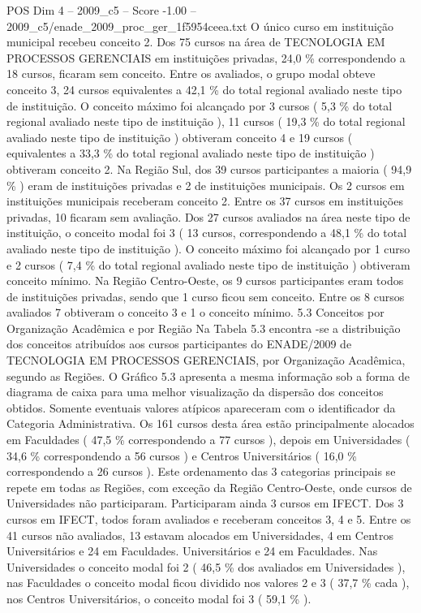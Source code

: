 \begin{textsample}{POS Dim 4 – 2009\_c5 – Score -1.00 – 2009\_c5/enade\_2009\_proc\_ger\_1f5954ceea.txt}
O único curso em instituição municipal recebeu conceito 2.
Dos 75 cursos na área de TECNOLOGIA EM PROCESSOS GERENCIAIS em instituições privadas, 24,0 \% correspondendo a 18 cursos, ficaram sem conceito.
Entre os avaliados, o grupo modal obteve conceito 3, 24 cursos equivalentes a 42,1 \% do total regional avaliado neste tipo de instituição.
O conceito máximo foi alcançado por 3 cursos ( 5,3 \% do total regional avaliado neste tipo de instituição ), 11 cursos ( 19,3 \% do total regional avaliado neste tipo de instituição ) obtiveram conceito 4 e 19 cursos ( equivalentes a 33,3 \% do total regional avaliado neste tipo de instituição ) obtiveram conceito 2.
Na Região Sul, dos 39 cursos participantes a maioria ( 94,9 \% ) eram de instituições privadas e 2 de instituições municipais.
Os 2 cursos em instituições municipais receberam conceito 2.
Entre os 37 cursos em instituições privadas, 10 ficaram sem avaliação.
Dos 27 cursos avaliados na área neste tipo de instituição, o conceito modal foi 3 ( 13 cursos, correspondendo a 48,1 \% do total avaliado neste tipo de instituição ).
O conceito máximo foi alcançado por 1 curso e 2 cursos ( 7,4 \% do total regional avaliado neste tipo de instituição ) obtiveram conceito mínimo.
Na Região Centro-Oeste, os 9 cursos participantes eram todos de instituições privadas, sendo que 1 curso ficou sem conceito.
Entre os 8 cursos avaliados 7 obtiveram o conceito 3 e 1 o conceito mínimo. 5.3 Conceitos por Organização Acadêmica e por Região Na Tabela 5.3 encontra -se a distribuição dos conceitos atribuídos aos cursos participantes do ENADE/2009 de TECNOLOGIA EM PROCESSOS GERENCIAIS, por Organização Acadêmica, segundo as Regiões.
O Gráfico 5.3 apresenta a mesma informação sob a forma de diagrama de caixa para uma melhor visualização da dispersão dos conceitos obtidos.
Somente eventuais valores atípicos apareceram com o identificador da Categoria Administrativa.
Os 161 cursos desta área estão principalmente alocados em Faculdades ( 47,5 \% correspondendo a 77 cursos ), depois em Universidades ( 34,6 \% correspondendo a 56 cursos ) e Centros Universitários ( 16,0 \% correspondendo a 26 cursos ).
Este ordenamento das 3 categorias principais se repete em todas as Regiões, com exceção da Região Centro-Oeste, onde cursos de Universidades não participaram.
Participaram ainda 3 cursos em IFECT.
Dos 3 cursos em IFECT, todos foram avaliados e receberam conceitos 3, 4 e 5.
Entre os 41 cursos não avaliados, 13 estavam alocados em Universidades, 4 em Centros Universitários e 24 em Faculdades.
Universitários e 24 em Faculdades.
Nas Universidades o conceito modal foi 2 ( 46,5 \% dos avaliados em Universidades ), nas Faculdades o conceito modal ficou dividido nos valores 2 e 3 ( 37,7 \% cada ), nos Centros Universitários, o conceito modal foi 3 ( 59,1 \% ).

\end{textsample}

